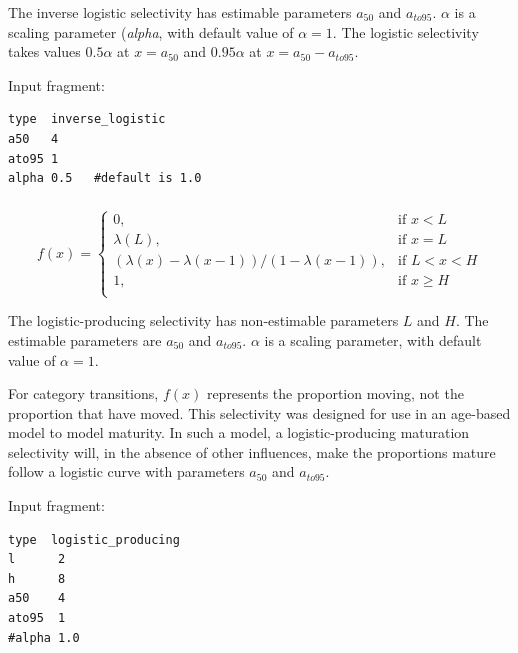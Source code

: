 The inverse logistic selectivity has estimable parameters $a_{50}$ and $a_{to95}$. $\alpha$ is a scaling parameter (\textit{alpha}, with default value of $\alpha = 1$. The logistic selectivity takes values $0.5 \alpha$ at $x=a_{50}$ and $0.95 \alpha$ at $x=a_{50}-a_{to95}$.

Input fragment: {\small{\begin{verbatim}
type  inverse_logistic
a50   4
ato95 1
alpha 0.5   #default is 1.0
\end{verbatim}}}

\subsubsection[Logistic producing]{}

\begin{equation}
f(x)=\begin{cases}
	  0, & \text{if $x < L$} \\
	  \lambda(L), & \text{if $x=L$} \\
	  \left( \lambda(x)-\lambda(x-1) \right) / \left( 1-\lambda(x-1) \right), & \text{if $L < x < H$} \\
	  1, & \text{if $x \ge H$} \\
  \end{cases}
\end{equation}

The logistic-producing selectivity has non-estimable parameters $L$ and $H$. The estimable parameters are $a_{50}$ and $a_{to95}$. $\alpha$ is a scaling parameter, with default value of $\alpha = 1$.

For category transitions, $f(x)$ represents the proportion moving, not the proportion that have moved. This selectivity was designed for use in an age-based model to model maturity. In such a model, a logistic-producing maturation selectivity will, in the absence of other influences, make the proportions mature follow a logistic curve with parameters $a_{50}$ and $a_{to95}$.

Input fragment: {\small{\begin{verbatim}
type  logistic_producing
l      2
h      8
a50    4
ato95  1
#alpha 1.0
\end{verbatim}}}

\subsubsection[Double-normal]{}

